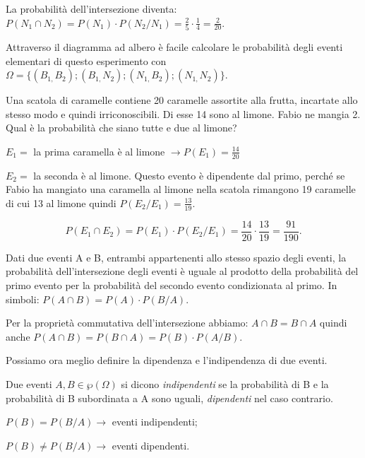 \begin{esempio}
\begin{center}
\begin{tikzpicture}[x=10mm,y=10mm,font=\small]
\end{tikzpicture}

\end{center}

La probabilità dell'intersezione diventa: $P(N_1\cap N_2)=P(N_1)\cdot 
P(N_2/N_1)=\frac 2 5\cdot \frac 1 4=\frac 2{20}$.

Attraverso il diagramma ad albero è facile calcolare le probabilità degli 
eventi 
elementari di questo esperimento con $\Omega 
=\{(B_{1,}B_2);(B_{1,}N_2);(N_{1,}B_2);(N_{1,}N_2)\}$.
\end{esempio}

\begin{esempio}
Una scatola di caramelle contiene 20 caramelle assortite alla frutta, 
incartate allo stesso modo e quindi irriconoscibili. Di esse 14 sono al 
limone. Fabio ne mangia 2. Qual è la probabilità che siano tutte e due al 
limone?
\begin{itemize*}
\item $E_1=$ la prima caramella è al limone $\to P(E_1)=\frac{14}{20}$
\item $E_2=$ la seconda è al limone. Questo evento è dipendente dal primo, 
perché se Fabio ha mangiato una caramella al limone nella scatola rimangono 
19 caramelle di cui 13 al limone quindi $P(E_2/E_1)=\frac{13}{19}$.
\end{itemize*}
\[P(E_1\cap E_2)=P(E_1)\cdot P(E_2/E_1)=\frac{14}{20}\cdot 
\frac{13}{19}=\frac{91}{190}.\]
\end{esempio}

\begin{teorema}
Dati due eventi A e B, entrambi appartenenti allo stesso spazio degli eventi, 
la 
probabilità dell'intersezione degli eventi è uguale al prodotto della 
probabilità del primo evento per la probabilità del secondo evento 
condizionata al primo. In simboli: $P(A\cap B)=P(A)\cdot P(B/A)$.
\end{teorema}

Per la proprietà commutativa dell'intersezione abbiamo: $A\cap B=B\cap A$ 
quindi 
anche $P(A\cap B)=P(B\cap A)=P(B)\cdot P(A/B)$.

Possiamo ora meglio definire la dipendenza e l'indipendenza di due eventi.

\begin{definizione}
Due eventi $A,B\in \wp (\Omega )$ si dicono \emph{indipendenti} se la 
probabilità di B e la probabilità di B subordinata a A sono uguali, 
\emph{dipendenti} nel caso contrario.

$P(B)=P(B/A)\to$ eventi indipendenti;

 ${P}(B)\neq P(B/A)\to$ eventi dipendenti.
\end{definizione}

